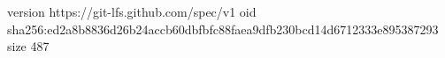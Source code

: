 version https://git-lfs.github.com/spec/v1
oid sha256:ed2a8b8836d26b24accb60dbfbfc88faea9dfb230bcd14d6712333e895387293
size 487
